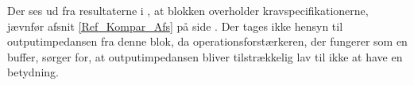 \noindent Der ses ud fra resultaterne i , at blokken overholder kravspecifikationerne, jævnfør afsnit \ref{Ref_Kompar_Afs} på side \pageref{Ref_Kompar_Afs}. %
Der tages ikke hensyn til outputimpedansen fra denne blok, da operationsforstærkeren, der fungerer som en buffer, sørger for, at outputimpedansen bliver tilstrækkelig lav til ikke at have en betydning.